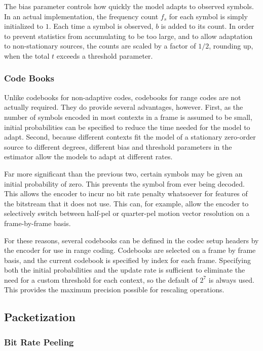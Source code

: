 \documentclass[11pt,letterpaper]{article}
\begin{document}
The bias parameter controls how quickly the model adapts to observed symbols.
In an actual implementation, the frequency count $f_s$ for each symbol is
 simply initialized to $1$.
Each time a symbol is observed, $b$ is added to its count.
In order to prevent statistics from accumulating to be too large, and to allow
 adaptation to non-stationary sources, the counts are scaled by a factor of
 $1/2$, rounding up, when the total $t$ exceeds a threshold parameter.

\subsubsection{Code Books}

Unlike codebooks for non-adaptive codes, codebooks for range codes are not
 actually required.
They do provide several advantages, however.
First, as the number of symbols encoded in most contexts in a frame is assumed
 to be small, initial probabilities can be specified to reduce the time needed
 for the model to adapt.
Second, because different contexts fit the model of a stationary zero-order
 source to different degrees, different bias and threshold parameters in the
 estimator allow the models to adapt at different rates.

Far more significant than the previous two, certain symbols may be given an
 initial probability of zero.
This prevents the symbol from ever being decoded.
This allows the encoder to incur no bit rate penalty whatsoever for features of
 the bitstream that it does not use.
This can, for example, allow the encoder to selectively switch between half-pel
 or quarter-pel motion vector resolution on a frame-by-frame basis.

For these reasons, several codebooks can be defined in the codec setup headers
 by the encoder for use in range coding.
Codebooks are selected on a frame by frame basis, and the current codebook is
 specified by index for each frame.
Specifying both the initial probabilities and the update rate is sufficient to
 eliminate the need for a custom threshold for each context, so the default of
 $2^7$ is always used.
This provides the maximum precision possible for rescaling operations.

\subsection{Packetization}

\subsubsection{Bit Rate Peeling}
\end{document}
